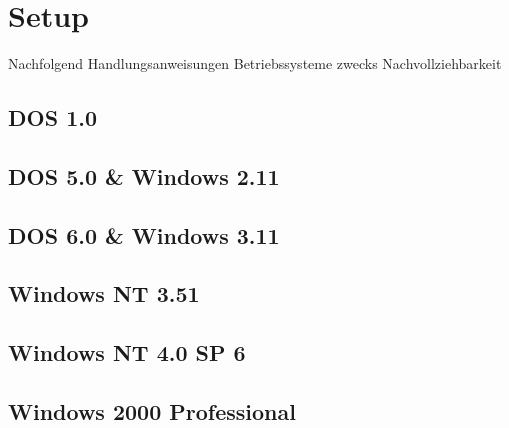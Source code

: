 \chapter{Setup}
\label{chap:setup}

Nachfolgend Handlungsanweisungen Betriebssysteme zwecks Nachvollziehbarkeit


\section{DOS 1.0}


\section{DOS 5.0 \& Windows 2.11}


\section{DOS 6.0 \& Windows 3.11}


\section{Windows NT 3.51}


\section{Windows NT 4.0 SP 6}


\section{Windows 2000 Professional}
